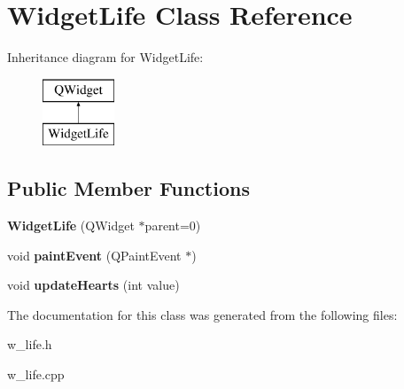 \hypertarget{class_widget_life}{}\section{Widget\+Life Class Reference}
\label{class_widget_life}
Inheritance diagram for Widget\+Life\+:\begin{figure}[H]
\begin{center}
\leavevmode
\includegraphics[height=2.000000cm]{class_widget_life}
\end{center}
\end{figure}
\subsection*{Public Member Functions}
\begin{DoxyCompactItemize}
\item 
\hypertarget{class_widget_life_a1d39aa69bd9872b67d0e5164f0bb1ca8}{}{\bfseries Widget\+Life} (Q\+Widget $\ast$parent=0)\label{class_widget_life_a1d39aa69bd9872b67d0e5164f0bb1ca8}

\item 
\hypertarget{class_widget_life_ab41e1bce66c7891a9f6f64d42d4f6055}{}void {\bfseries paint\+Event} (Q\+Paint\+Event $\ast$)\label{class_widget_life_ab41e1bce66c7891a9f6f64d42d4f6055}

\item 
\hypertarget{class_widget_life_af27cf30c08d8a7a85e29a0a3e2fae0b0}{}void {\bfseries update\+Hearts} (int value)\label{class_widget_life_af27cf30c08d8a7a85e29a0a3e2fae0b0}

\end{DoxyCompactItemize}


The documentation for this class was generated from the following files\+:\begin{DoxyCompactItemize}
\item 
w\+\_\+life.\+h\item 
w\+\_\+life.\+cpp\end{DoxyCompactItemize}

